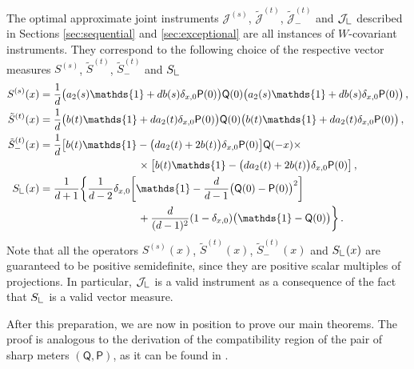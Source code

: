 \documentclass[12pt,reqno]{amsart}
\theoremstyle{definition}
\newcommand{\id}{\mathds{1}} %
\newcommand{\Qo}{\mathsf{Q}}%
\newcommand{\Po}{\mathsf{P}}%
\newcommand{\Lcorner}{{\mathchoice{\mathrel{\makebox[7pt][c]{\rule{.4pt}{7.5pt}\rule{5pt}{.4pt}}}}{\mathrel{\makebox[7pt][c]{\rule{.4pt}{7.5pt}\rule{5pt}{.4pt}}}}{\mathrel{\makebox[5.5pt][c]{\rule{.4pt}{5.25pt}\rule{3.5pt}{.4pt}}}}{\mathrel{\makebox[4pt][c]{\rule{.4pt}{3.75pt}\rule{2.5pt}{.4pt}}}}}}
\newcommand{\ii}{\mathcal{J}}
\begin{document}
The optimal approximate joint instruments $\ii^{(s)}$, $\tilde{\ii}^{(t)}$, $\tilde{\ii}_-^{(t)}$ and $\ii_\Lcorner$ described in Sections \ref{sec:sequential} and \ref{sec:exceptional} are all instances of $W$-covariant instruments. They correspond to the following choice of the respective vector measures $S^{(s)}$, $\tilde{S}^{(t)}$, $\tilde{S}_-^{(t)}$ and $S_\Lcorner$
\begin{align*}
S^{(s)}(x) = {} & \frac{1}{d} \big(a_2(s)\id + db(s)\delta_{x,0}\Po(0)\big) \Qo(0) \big(a_2(s)\id + db(s)\delta_{x,0}\Po(0)\big)\,, \\
\tilde{S}^{(t)}(x) = {} & \frac{1}{d} \big(b(t)\id + da_2(t)\delta_{x,0}\Po(0)\big) \Qo(0) \big(b(t)\id + da_2(t)\delta_{x,0}\Po(0)\big)\,, \\
\tilde{S}_-^{(t)}(x) = {} & \frac{1}{d} \big[b(t)\id - \big(da_2(t)+2b(t)\big)\delta_{x,0}\Po(0)\big] \Qo(-x) \times \\
& \qquad\qquad\qquad\qquad \times \big[b(t)\id - \big(da_2(t)+2b(t)\big)\delta_{x,0}\Po(0)\big]\,, \\
S_\Lcorner(x) = {} & \frac{1}{d+1} \bigg\{\frac{1}{d-2}\delta_{x,0}\bigg[\id-\frac{d}{d-1}\big(\Qo(0)-\Po(0)\big)^2\bigg] \\
& \qquad\qquad\qquad\qquad + \frac{d}{(d-1)^2}(1-\delta_{x,0})\big(\id-\Qo(0)\big)\bigg\}\,.
\end{align*}
Note that all the operators $S^{(s)}(x)$, $\tilde{S}^{(t)}(x)$, $\tilde{S}_-^{(t)}(x)$ and $S_\Lcorner(x)$ are guaranteed to be positive semidefinite, since they are positive scalar multiples of projections. In particular, $\ii_\Lcorner$ is a valid instrument as a consequence of the fact that $S_\Lcorner$ is a valid vector measure.

After this preparation, we are now in position to prove our main theorems. The proof is analogous to the derivation of the compatibility region of the pair of sharp meters $(\Qo,\Po)$, as it can be found in \cite[Proposition 5]{CaHeTo12}.
\end{document}

